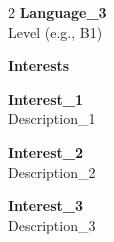 \documentclass[a4paper,10pt]{article}
\newcommand{\cvsection}[1]{%
    \vspace{1.2em}
    {\color{primary}\large\bfseries #1}
    \vspace{0.6em}
    \par
}
\begin{document}
\begin{paracol}{2}
\vspace{0.6em}
\textbf{Language\_3}\\
{\color{darkgray}\small Level (e.g., B1)}

\cvsection{Interests}

\textbf{Interest\_1}\\
{\color{darkgray}\small Description\_1}

\vspace{0.5em}
\textbf{Interest\_2}\\
{\color{darkgray}\small Description\_2}

\vspace{0.5em}
\textbf{Interest\_3}\\
{\color{darkgray}\small Description\_3}

\end{paracol}
\end{document}
